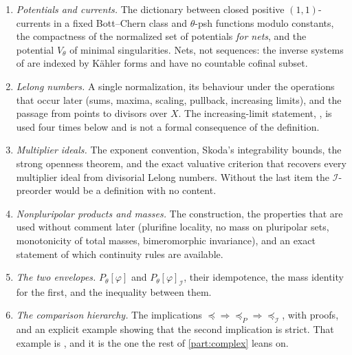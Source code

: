 \begin{enumerate}
\item\label{itm:ch51-need:currents}
      \emph{Potentials and currents.}  The dictionary between closed
      positive \((1,1)\)-currents in a fixed Bott--Chern class and
      \(\theta\)-psh functions modulo constants, the compactness of the
      normalized set of potentials \emph{for nets}, and the potential
      \(V_\theta\) of minimal singularities.  Nets, not sequences: the
      inverse systems of  are indexed by
      K\"ahler forms and have no countable cofinal subset.
\item\label{itm:ch51-need:lelong}
      \emph{Lelong numbers.}  A single normalization, its behaviour under
      the operations that occur later (sums, maxima, scaling, pullback,
      increasing limits), and the passage from points to divisors over
      \(X\).  The increasing-limit statement,
      , is used four times below and is
      not a formal consequence of the definition.
\item\label{itm:ch51-need:ideals}
      \emph{Multiplier ideals.}  The exponent convention, Skoda's
      integrability bounds, the strong openness theorem, and the exact
      valuative criterion that recovers every multiplier ideal from
      divisorial Lelong numbers.  Without the last item the
      \(\mathcal I\)-preorder would be a definition with no content.
\item\label{itm:ch51-need:npp}
      \emph{Nonpluripolar products and masses.}  The construction, the
      properties that are used without comment later (plurifine locality,
      no mass on pluripolar sets, monotonicity of total masses,
      bimeromorphic invariance), and an exact statement of which
      continuity rules are available.
\item\label{itm:ch51-need:envelopes}
      \emph{The two envelopes.}  \(P_\theta[\varphi]\) and
      \(P_\theta[\varphi]_{\mathcal I}\), their idempotence, the mass
      identity for the first, and the inequality between them.
\item\label{itm:ch51-need:comparison}
      \emph{The comparison hierarchy.}  The implications
      \(\preceq\Rightarrow\preceq_P\Rightarrow\preceq_{\mathcal I}\), with
      proofs, and an explicit example showing that the second implication
      is strict.  That example is , and it is the one
      the rest of \cref{part:complex} leans on.
\end{enumerate}

